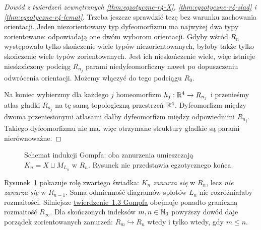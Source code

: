 \begin{proof}[Dowód z twierdzeń zewnętrznych
\ref{thm:egzotyczne-r4-X},
\ref{thm:egzotyczne-r4-slad} i
\ref{thm:egzotyczne-r4-lemat}]
Trzeba jeszcze sprawdzić tezę bez warunku
zachowania orientacji. Jeden niezorientowany
typ dyfeomorfizmu ma najwyżej dwa typy
zorientowane: odpowiadają one dwóm wyborom
orientacji. Gdyby wśród $R_n$ występowało
tylko skończenie wiele typów niezorientowanych,
byłoby także tylko skończenie wiele typów
zorientowanych. Jest ich nieskończenie wiele,
więc istnieje nieskończony podciąg $R_{n_j}$
parami niedyfeomorficzny nawet po dopuszczeniu
odwrócenia orientacji.
Możemy włączyć do tego podciągu $R_0$.

Na koniec wybierzmy dla każdego $j$ homeomorfizm
$h_j:\mathbb{R}^4\to R_{n_j}$ i przenieśmy atlas gładki
$R_{n_j}$ na tę samą topologiczną przestrzeń
$\mathbb{R}^4$. Dyfeomorfizm między dwoma przeniesionymi
atlasami dałby dyfeomorfizm między odpowiednimi
$R_{n_j}$. Takiego dyfeomorfizmu nie ma, więc
otrzymane struktury gładkie są parami nierównoważne.
\end{proof}

\begin{figure}[htbp]
\centering
{}
\caption{Schemat indukcji Gompfa: oba zanurzenia
umieszczają $K_n=X\sqcup M_{L_n}$ w $R_n$.
Rysunek nie przedstawia egzotycznego końca.}
\label{fig:egzotyczne-r4-indukcja}
\end{figure}

Rysunek~\ref{fig:egzotyczne-r4-indukcja} pokazuje
rolę zwartego świadka: $K_n$ \emph{zanurza się}
w $R_n$, lecz \emph{nie zanurza się} w $R_{n-1}$.
Sama odmienność diagramów splotów $L_n$ nie
rozróżniałaby rozmaitości. Silniejsze
\href{https://doi.org/10.4310/jdg/1214439566}
{twierdzenie~1.3 Gompfa} obejmuje ponadto graniczną
rozmaitość $R_\infty$. Dla skończonych indeksów
$m,n\in\mathbb{N}_0$ powyższy dowód daje porządek
zorientowanych zanurzeń:
$R_m\hookrightarrow R_n$ wtedy i tylko wtedy,
gdy $m\leq n$.


